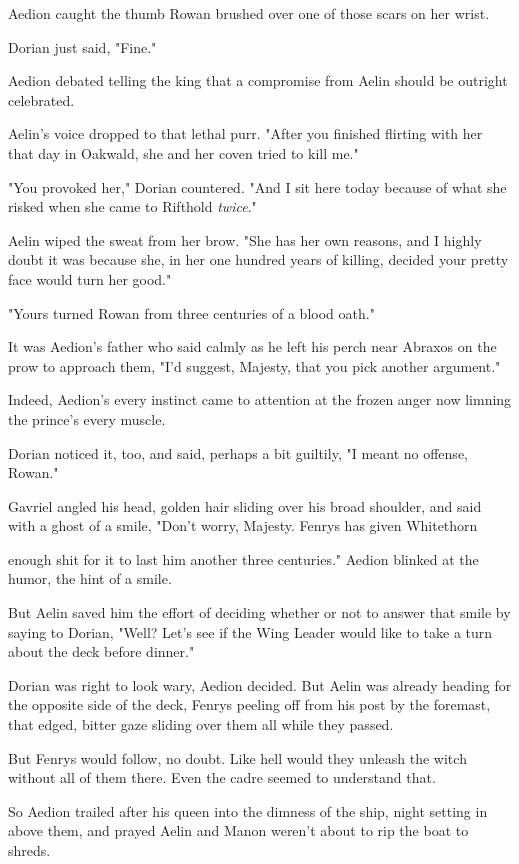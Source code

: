 Aedion caught the thumb Rowan brushed over one of those scars on her wrist.

Dorian just said, "Fine."

Aedion debated telling the king that a compromise from Aelin should be outright celebrated.

Aelin's voice dropped to that lethal purr. "After you finished flirting with her that day in Oakwald, she and her coven tried to kill me."

"You provoked her," Dorian countered. "And I sit here today because of what she risked when she came to Rifthold \emph{twice}."

Aelin wiped the sweat from her brow. "She has her own reasons, and I highly doubt it was because she, in her one hundred years of killing, decided your pretty face would turn her good."

"Yours turned Rowan from three centuries of a blood oath."

It was Aedion's father who said calmly as he left his perch near Abraxos on the prow to approach them, "I'd suggest, Majesty, that you pick another argument."

Indeed, Aedion's every instinct came to attention at the frozen anger now limning the prince's every muscle.

Dorian noticed it, too, and said, perhaps a bit guiltily, "I meant no offense, Rowan."

Gavriel angled his head, golden hair sliding over his broad shoulder, and said with a ghost of a smile, "Don't worry, Majesty. Fenrys has given Whitethorn

enough shit for it to last him another three centuries." Aedion blinked at the humor, the hint of a smile.

But Aelin saved him the effort of deciding whether or not to answer that smile by saying to Dorian, "Well? Let's see if the Wing Leader would like to take a turn about the deck before dinner."

Dorian was right to look wary, Aedion decided. But Aelin was already heading for the opposite side of the deck, Fenrys peeling off from his post by the foremast, that edged, bitter gaze sliding over them all while they passed.

But Fenrys would follow, no doubt. Like hell would they unleash the witch without all of them there. Even the cadre seemed to understand that.

So Aedion trailed after his queen into the dimness of the ship, night setting in above them, and prayed Aelin and Manon weren't about to rip the boat to shreds.

